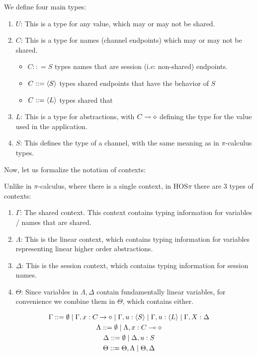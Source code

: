 We define four main types:
\begin{enumerate}
    \item $U$: This is a type for any value, which may or may not be shared.
    \item $C$: This is a type for names (channel endpoints) which may or may not be shared. \begin{itemize}
        \item $C :: = S$ types names that are session (i.e: non-shared) endpoints.
        \item $C ::= \langle S \rangle$ types shared endpoints that have the behavior of $S$ 
        \item $C ::= \langle L \rangle$ types shared that 
    \end{itemize}
    \item $L$: This is a type for abstractions, with $C \leadsto \diamond$ defining the type for the value used in the application.
    \item $S$: This defines the type of a channel, with the same meaning as in $\pi$-calculus types.
\end{enumerate}


Now, let us formalize the notation of contexts:

Unlike in $\pi$-calculus, where there is a single context, in HOS$\pi$ there are 3 types of contexts:
\begin{enumerate}
    \item $\Gamma$: The shared context. This context contains typing information for variables / names that are shared.
    \item $\Lambda$: This is the linear context, which contains typing information for variables representing linear higher order abstractions.
    \item $\Delta$: This is the session context, which contains typing information for session names.
    \item $\Theta$: Since variables in $\Lambda, \Delta$ contain fundamentally linear variables, for convenience we combine them in $\Theta$, which contains either.
\end{enumerate}

\begin{gather*}
\Gamma ::= \emptyset \mid \Gamma, x : C \rightarrow \diamond \mid \Gamma, u : \langle S \rangle \mid \Gamma, u : \langle L \rangle \mid \Gamma, X : \Delta \\
\Lambda ::= \emptyset \mid \Lambda, x : C \multimap \diamond \\
\Delta ::= \emptyset \mid \Delta, u : S \\
\Theta ::= \Theta,\Lambda \mid \Theta,\Delta
\end{gather*}

